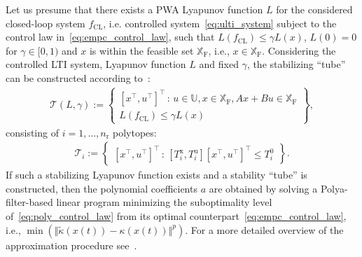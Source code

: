 \documentclass[letterpaper, 10 pt, conference]{ieeeconf}
\begin{document}
	Let us presume that there exists a PWA Lyapunov function $L$ for the considered closed-loop system $f_{\mathrm{CL}}$, i.e. controlled system~\eqref{eq:ulti_system} subject to the control law in~\eqref{eq:empc_control_law}, such that $L(f_{\mathrm{CL}}) \le \gamma L(x)$, $L(0) = 0$ for $\gamma \in [0,1)$ and $x$ is within the feasible set $\mathbb{X}_{\mathrm{F}}$, i.e., $x \in \mathbb{X}_{\mathrm{F}}$. Considering the controlled LTI system, Lyapunov function $L$ and fixed $\gamma$, the stabilizing ``tube'' can be constructed according to~\cite{tube_FCh}:
	\begin{eqnarray}
		\label{eq:stab_tube}
		\mathcal{T}(L, \gamma) := \begin{Bmatrix}
			[x^\top, u^\top]^\top \, : \, u \in \mathbb{U}, x \in \mathbb{X}_{\mathrm{F}} , A x + B u \in \mathbb{X}_{\mathrm{F}} \\
			L(f_{\mathrm{CL}}) \le \gamma L(x)
		\end{Bmatrix} \! , \nonumber 
	\end{eqnarray}
	consisting of $i = 1, \dots, n_\mathrm{r}$ polytopes:
	\begin{eqnarray}
		\label{eq:stab_tube_polytope}
		\mathcal{T}_i := \begin{Bmatrix}
			[x^\top, u^\top]^\top \, : \, [T_i^{\mathrm{x}}, T_i^{\mathrm{u}}] [x^\top, u^\top]^\top \le T_i^0		
		\end{Bmatrix}. 
	\end{eqnarray}
	If such a stabilizing Lyapunov function exists and a stability ``tube'' is constructed, then the polynomial coefficients $a$ are obtained by solving a Polya-filter-based linear program minimizing the suboptimality level of~\eqref{eq:poly_control_law} from its optimal counterpart~\eqref{eq:empc_control_law}, i.e., $\min(\Vert\widetilde{\kappa}(x(t)) -	\kappa(x(t))\Vert^{p})$. For a more detailed overview of the approximation procedure see~\cite{kvasnica_polynomial}.
	
	
\end{document}
